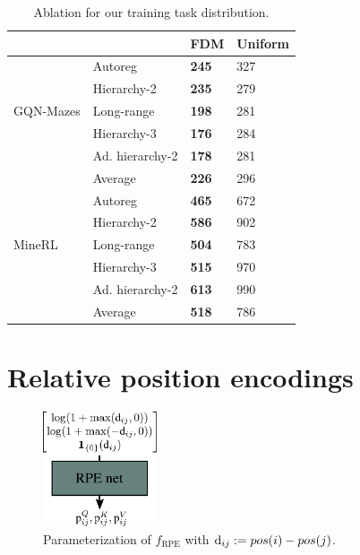 \begin{table}[t]
    \centering
    \small
    \caption{Ablation for our training task distribution.}
    \label{tab:fdm-task-dist-ablation}
    \begin{tabular}{l|l|ll}
    \toprule
        ~ & ~ & FDM & Uniform \\%
        \midrule
        \multirow{5}{*}{GQN-Mazes} & Autoreg & \textbf{245} & 327 \\%
        ~ & Hierarchy-2 & \textbf{235} & 279 \\%
        ~ & Long-range & \textbf{198} & 281 \\%
        ~ & Hierarchy-3 & \textbf{176} & 284 \\%
        ~ & Ad. hierarchy-2 & \textbf{178} & 281 \\%
        ~ & Average & \textbf{226} & 296 \\%
        \midrule
        ~ & Autoreg & \textbf{465} & 672 \\%
        ~ & Hierarchy-2 & \textbf{586} & 902 \\%
        MineRL & Long-range & \textbf{504} & 783 \\%
        ~ & Hierarchy-3 & \textbf{515} & 970 \\%
        ~ & Ad. hierarchy-2 & \textbf{613} & 990 \\%
        ~ & Average & \textbf{518} & 786 \\%
        \bottomrule
    \end{tabular}
\end{table}


\section{Relative position encodings} \label{app:fdm-rpe}

\begin{figure}
  \begin{center}
    \includegraphics[width=0.3\textwidth]{figs/fdm/rpe-net.pdf}
  \end{center}
  \caption{Parameterization of $f_\text{RPE}$ with ${\textnormal{d}}_{ij} := pos(i)-pos(j)$.}
  \label{fig:fdm-rpe-net}
\end{figure}

